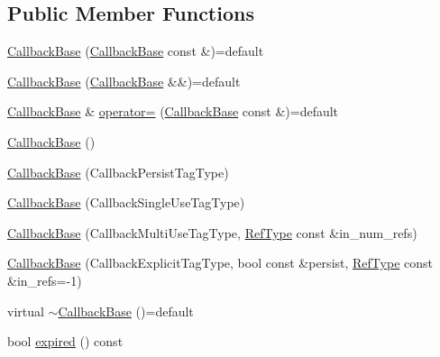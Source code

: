 \subsection*{Public Member Functions}
\begin{DoxyCompactItemize}
\item 
\hyperlink{structvt_1_1pipe_1_1callback_1_1_callback_base_aed02135f19f5d5ca4899d488ce402b64}{Callback\+Base} (\hyperlink{structvt_1_1pipe_1_1callback_1_1_callback_base}{Callback\+Base} const \&)=default
\item 
\hyperlink{structvt_1_1pipe_1_1callback_1_1_callback_base_aa90843711601bd1174ba64f69f754eb8}{Callback\+Base} (\hyperlink{structvt_1_1pipe_1_1callback_1_1_callback_base}{Callback\+Base} \&\&)=default
\item 
\hyperlink{structvt_1_1pipe_1_1callback_1_1_callback_base}{Callback\+Base} \& \hyperlink{structvt_1_1pipe_1_1callback_1_1_callback_base_a078375aa25cb0c0e2968804ef3a86a5f}{operator=} (\hyperlink{structvt_1_1pipe_1_1callback_1_1_callback_base}{Callback\+Base} const \&)=default
\item 
\hyperlink{structvt_1_1pipe_1_1callback_1_1_callback_base_a683cee48109181768cd44354bc98e3e1}{Callback\+Base} ()
\item 
\hyperlink{structvt_1_1pipe_1_1callback_1_1_callback_base_ae96d1355aa94b4fd32469bbb9280717c}{Callback\+Base} (Callback\+Persist\+Tag\+Type)
\item 
\hyperlink{structvt_1_1pipe_1_1callback_1_1_callback_base_a18840ed75fb94811cb34c17da8703588}{Callback\+Base} (Callback\+Single\+Use\+Tag\+Type)
\item 
\hyperlink{structvt_1_1pipe_1_1callback_1_1_callback_base_a87a0d70f0b3a7c8d94eb62c278ba9e0e}{Callback\+Base} (Callback\+Multi\+Use\+Tag\+Type, \hyperlink{namespacevt_a9b39ce9494bb04674d0d5b895a5aa50f}{Ref\+Type} const \&in\+\_\+num\+\_\+refs)
\item 
\hyperlink{structvt_1_1pipe_1_1callback_1_1_callback_base_a182bd31e2c3f804bb61a4b43907061d2}{Callback\+Base} (Callback\+Explicit\+Tag\+Type, bool const \&persist, \hyperlink{namespacevt_a9b39ce9494bb04674d0d5b895a5aa50f}{Ref\+Type} const \&in\+\_\+refs=-\/1)
\item 
virtual \hyperlink{structvt_1_1pipe_1_1callback_1_1_callback_base_adc39148be97af3105f9b5765431bdc9a}{$\sim$\+Callback\+Base} ()=default
\item 
bool \hyperlink{structvt_1_1pipe_1_1callback_1_1_callback_base_a9ef1595197b291a660e6d19aadb0203e}{expired} () const
\item 

\end{DoxyCompactItemize}
